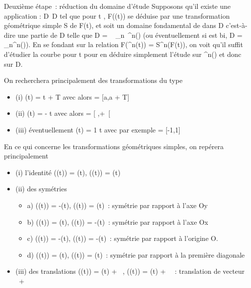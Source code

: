 \documentclass[]{article}
\begin{document}
Deuxième étape~: réduction du domaine d'étude Supposons qu'il existe une
application \theta : D\rightarrow~D tel que pour t \inD, F(\theta(t)) se déduise par une
transformation géométrique simple S de F(t), et soit \Delta un domaine
fondamental de \theta dans D c'est-à-dire une partie de D telle que D
= \⋃ ~
\_n\in{}~\theta^n(\Delta) (ou éventuellement si \theta est bi\jmathective, D
= \⋃ ~
\_n\theta^n(\Delta)). En se fondant sur la relation
F(\theta^n(t)) = S^n(F(t)), on voit qu'il suffit
d'étudier la courbe pour t \in \Delta pour en déduire simplement l'étude sur
\theta^n(\Delta) et donc sur D.

On recherchera principalement des transformations \theta du type

\begin{itemize}
\itemsep1pt\parskip0pt
\item
  (i) \theta(t) = t + T avec alors \Delta = {[}a,a + T{]} \bigcapD
\item
  (ii) \theta(t) = \omega - t avec alors \Delta = {[} \omega {}
  ,+\infty~{[}\bigcapD
\item
  (iii) éventuellement \theta(t) = 1 \over t avec par
  exemple \Delta = {[}-1,1{]} \bigcapD
\end{itemize}

En ce qui concerne les transformations géométriques simples, on repérera
principalement

\begin{itemize}
\itemsep1pt\parskip0pt
\item
  (i) l'identité \phi(\theta(t)) = \phi(t), \psi(\theta(t)) = \psi(t)
\item
  (ii) des symétries

  \begin{itemize}
  \itemsep1pt\parskip0pt
  \item
    a) \phi(\theta(t)) = -\phi(t), \psi(\theta(t)) = \psi(t)~: symétrie par rapport à l'axe Oy
  \item
    b) \phi(\theta(t)) = \phi(t), \psi(\theta(t)) = -\psi(t)~: symétrie par rapport à l'axe Ox
  \item
    c) \phi(\theta(t)) = -\phi(t), \psi(\theta(t)) = -\psi(t)~: symétrie par rapport à
    l'origine O.
  \item
    d) \phi(\theta(t)) = \psi(t), \psi(\theta(t)) = \phi(t)~: symétrie par rapport à la
    première diagonale
  \end{itemize}
\item
  (iii) des translations \phi(\theta(t)) = \phi(t) + \alpha~, \psi(\theta(t)) = \psi(t) + \beta~~:
  translation de vecteur \alpha~\vec\imath +
  \beta~
\end{itemize}
\end{document}
